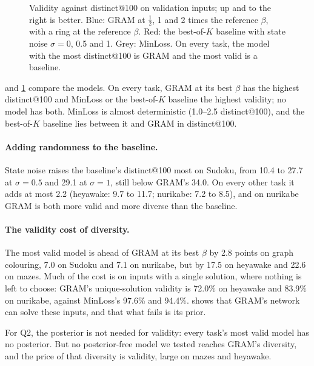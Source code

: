 \documentclass{article}
\newcommand{\bok}{best-of-$K$}
\begin{document}
\begin{figure}[t]
\caption{Validity against distinct@100 on validation inputs; up and to the right is better. Blue: GRAM at
$\frac12$, 1 and 2 times the reference $\beta$, with a ring at the reference $\beta$. Red: the \bok{} baseline with
state noise $\sigma=0$, 0.5 and 1. Grey: MinLoss. On every task, the model with the most distinct@100 is GRAM and
the most valid is a baseline.}
\label{fig:frontier}
\end{figure}

 and \cref{fig:frontier} compare the models. On every task, GRAM at its best $\beta$ has the highest distinct@100 and
MinLoss or the \bok{} baseline the highest validity; no model has both. MinLoss is almost deterministic (1.0--2.5
distinct@100), and the \bok{} baseline lies between it and GRAM in distinct@100.

\paragraph{Adding randomness to the baseline.} State noise raises the baseline's distinct@100 most on Sudoku, from
10.4 to 27.7 at $\sigma=0.5$ and 29.1 at $\sigma=1$, still below GRAM's 34.0. On every other task it adds at most 2.2
(heyawake: 9.7 to 11.7; nurikabe: 7.2 to 8.5), and on nurikabe GRAM is both more valid and more diverse than the
baseline.

\paragraph{The validity cost of diversity.} The most valid model is ahead of GRAM at its best $\beta$ by 2.8 points
on graph colouring, 7.0 on Sudoku and 7.1 on nurikabe, but by 17.5 on heyawake and 22.6 on mazes. Much of the cost is
on inputs with a single solution, where nothing is left to choose: GRAM's unique-solution validity is 72.0\% on
heyawake and 83.9\% on nurikabe, against MinLoss's 97.6\% and 94.4\%.  shows that GRAM's network can
solve these inputs, and that what fails is its prior.

For Q2, the posterior is not needed for validity: every task's most valid model has no posterior. But no
posterior-free model we tested reaches GRAM's diversity, and the price of that diversity is validity, large on mazes and
heyawake.
\end{document}
